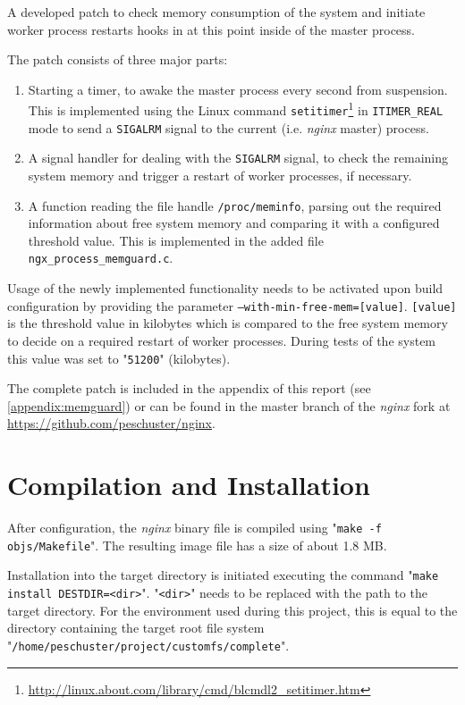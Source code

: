 A developed patch to check memory consumption of the system and initiate worker process restarts hooks in at this point inside of the master process. 

The patch consists of three major parts:

\begin{enumerate}

\item Starting a timer, to awake the master process every second from suspension. This is implemented using the Linux command \texttt{setitimer}\footnote{\url{http://linux.about.com/library/cmd/blcmdl2\_setitimer.htm}} in \texttt{ITIMER\_REAL} mode to send a \texttt{SIGALRM} signal to the current (i.e. \textit{nginx} master) process.

\item A signal handler for dealing with the \texttt{SIGALRM} signal, to check the remaining system memory and trigger a restart of worker processes, if necessary.

\item A function reading the file handle \texttt{/proc/meminfo}, parsing out the required information about free system memory and comparing it with a configured threshold value. This is implemented in the added file \texttt{ngx\_process\_memguard.c}.
\end{enumerate}

Usage of the newly implemented functionality needs to be activated upon build configuration by providing the parameter \texttt{--with-min-free-mem=[value]}. \texttt{[value]} is the threshold value in kilobytes which is compared to the free system memory to decide on a required restart of worker processes. During tests of the system this value was set to "\texttt{51200}" (kilobytes).

The complete patch is included in the appendix of this report (see \ref{appendix:memguard}) or can be found in the master branch of the \textit{nginx} fork at \url{https://github.com/peschuster/nginx}.
\\

\section{Compilation and Installation}

After configuration, the \textit{nginx} binary file is compiled using "\texttt{make -f objs/Makefile}". The resulting image file has a size of about 1.8 MB.

Installation into the target directory is initiated executing the command "\texttt{make install DESTDIR=<dir>}". "\texttt{<dir>}" needs to be replaced with the path to the target directory. For the environment used during this project, this is equal to the directory containing the target root file system "\texttt{/home/peschuster/project/customfs/complete}".

